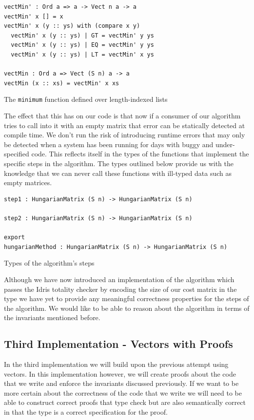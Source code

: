 \documentclass[a4paper, notitlepage]{report}
\begin{document}
\begin{listing}[H]
\begin{verbatim}
vectMin' : Ord a => a -> Vect n a -> a
vectMin' x [] = x
vectMin' x (y :: ys) with (compare x y)
  vectMin' x (y :: ys) | GT = vectMin' y ys
  vectMin' x (y :: ys) | EQ = vectMin' y ys
  vectMin' x (y :: ys) | LT = vectMin' x ys

vectMin : Ord a => Vect (S n) a -> a
vectMin (x :: xs) = vectMin' x xs
\end{verbatim}
\caption{The \texttt{minimum} function defined over length-indexed lists}
\end{listing}

The effect that this has on our code is that now if a consumer of our algorithm
tries to call into it with an empty matrix that error can be statically detected
at compile time. We don't run the risk of introducing runtime errors that may
only be detected when a system has been running for days with buggy and
under-specified code. This reflects itself in the types of the functions that
implement the specific steps in the algorithm. The types outlined below provide
us with the knowledge that we can never call these functions with ill-typed data
such as empty matrices.

\begin{listing}[H]
\begin{verbatim}
step1 : HungarianMatrix (S n) -> HungarianMatrix (S n)

step2 : HungarianMatrix (S n) -> HungarianMatrix (S n)

export
hungarianMethod : HungarianMatrix (S n) -> HungarianMatrix (S n)
\end{verbatim}
\caption{Types of the algorithm's steps}
\end{listing}

Although we have now introduced an implementation of the algorithm which passes
the Idris totality checker by encoding the size of our cost matrix in the type
we have yet to provide any meaningful correctness properties for the steps of
the algorithm. We would like to be able to reason about the algorithm in terms
of the invariants mentioned before.

\subsection{Third Implementation - Vectors with Proofs}
\label{sec:org61dccbe}
In the third implementation we will build upon the previous attempt using
vectors. In this implementation however, we will create proofs about the code
that we write and enforce the invariants discussed previously. If we want to be
more certain about the correctness of the code that we write we will need to be
able to construct correct proofs that type check but are also semantically
correct in that the type is a correct specification for the proof.
\end{document}

